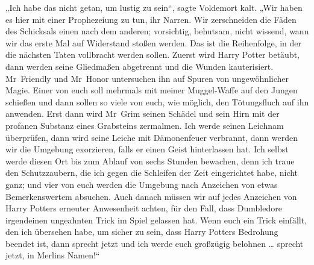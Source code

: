 „Ich habe das nicht getan, um lustig zu sein“, sagte Voldemort kalt.
„Wir haben es hier mit einer Prophezeiung zu tun, ihr Narren. Wir zerschneiden die Fäden des Schicksals einen nach dem anderen; vorsichtig, behutsam, nicht wissend, wann wir das erste Mal auf Widerstand stoßen werden. Das ist die Reihenfolge, in der die nächsten Taten vollbracht werden sollen. Zuerst wird Harry Potter betäubt, dann werden seine Gliedmaßen abgetrennt und die Wunden kauterisiert. Mr~Friendly und Mr~Honor untersuchen ihn auf Spuren von ungewöhnlicher Magie. Einer von euch soll mehrmals mit meiner Muggel-Waffe auf den Jungen schießen und dann sollen so viele von euch, wie möglich, den Tötungsfluch auf ihn anwenden. Erst dann wird Mr~Grim seinen Schädel und sein Hirn mit der profanen Substanz eines Grabsteins zermalmen. Ich werde seinen Leichnam überprüfen, dann wird seine Leiche mit Dämonenfeuer verbrannt, dann werden wir die Umgebung exorzieren, falls er einen Geist hinterlassen hat. Ich selbst werde diesen Ort bis zum Ablauf von sechs Stunden bewachen, denn ich traue den Schutzzaubern, die ich gegen die Schleifen der Zeit eingerichtet habe, nicht ganz; und vier von euch werden die Umgebung nach Anzeichen von etwas Bemerkenswertem absuchen. Auch danach müssen wir auf jedes Anzeichen von Harry Potters erneuter Anwesenheit achten, für den Fall, dass Dumbledore irgendeinen ungeahnten Trick im Spiel gelassen hat. Wenn euch ein Trick einfällt, den ich übersehen habe, um sicher zu sein, dass Harry Potters Bedrohung beendet ist, dann sprecht jetzt und ich werde euch großzügig belohnen … sprecht jetzt, in Merlins Namen!“


